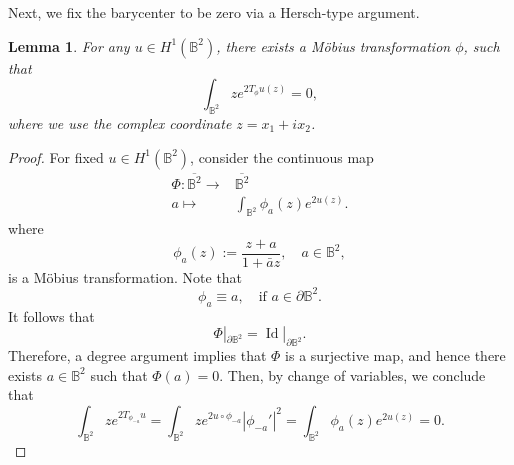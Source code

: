 \documentclass[11pt,a4paper,twoside]{amsart}
\newtheorem{lemma}[theorem]{Lemma}
\newtheorem{sketch proof}{Sketch of the proof}[section]
\begin{document}
    Next, we fix the barycenter to be zero via a Hersch-type argument.
    \begin{lemma}
    \label{lem. Disk Hersch normalization}
        For any $u\in H^1(\mathbb{B}^2)$, there exists a M\"obius transformation $\phi$, such that
        \[
        \int_{\mathbb{B}^2}ze^{2T_\phi u(z)}=0,
        \]
        where we use the complex coordinate $z=x_1+ix_2$.
    \end{lemma}
    \begin{proof}
        For fixed $u\in H^1(\mathbb{B}^2)$, consider the continuous map
        \begin{align*}
            \Phi:\overline{\mathbb{B}^2}\to& \overline{\mathbb{B}^2}\\
            a\mapsto& \int_{\mathbb{B}^2}
            \phi_a(z)e^{2u(z)}.
        \end{align*}
        where  
        \begin{equation}
        \label{eq. Mobius transformation}
            \phi_a(z):=\frac{z+a}{1+\bar{a}z},\quad a\in\mathbb{B}^2,
        \end{equation}
        is a M\"obius transformation.
        Note that 
        \[
        \phi_a\equiv a, \quad \text{if }a\in\partial \mathbb{B}^2.
        \]
        It follows that
        \[
        \Phi|_{\partial\mathbb{B}^2}
        =\operatorname{Id}|
        _{\partial\mathbb{B}^2}.
        \]
        Therefore, a degree argument implies that $\Phi$ is a surjective map, and hence there exists $a\in\mathbb{B}^2$ such that $\Phi(a)=0$.
        Then, by change of variables,  we conclude that
        \[
        \int_{\mathbb{B}^2}ze^{2T_{\phi_{-a}}u}
        =\int_{\mathbb{B}^2}ze^{2u\circ \phi_{-a}}|\phi_{-a}'|^2
        =\int_{\mathbb{B}^2} \phi_a(z)e^{2u(z)}
        =0.
        \]
    \end{proof}
\end{document}
